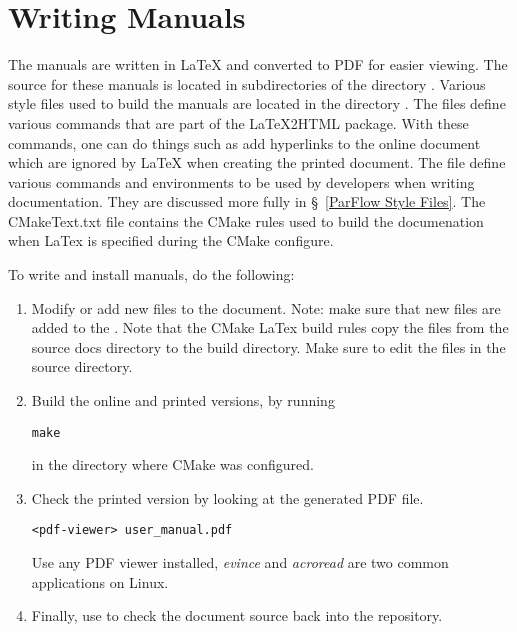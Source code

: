 \section{Writing Manuals}
\label{Writing Manuals}

The \parflow{} manuals are written in LaTeX and converted to PDF for
easier viewing.  The source for these manuals is located in
subdirectories of the directory .  Various
style files used to build the \parflow{} manuals are located in the
directory .  The files 
define various commands that are part of the LaTeX2HTML package.  With
these commands, one can do things such as add hyperlinks to the online
document which are ignored by LaTeX when creating the printed
document.  The file  define various commands and
environments to be used by \parflow{} developers when writing
documentation.  They are discussed more fully in \S~\ref{ParFlow Style
  Files}.  The CMakeText.txt file contains the CMake rules used to
build the documenation when LaTex is specified during the CMake
configure.

To write and install \parflow{} manuals, do the following:
\begin{enumerate}

\item
Modify or add new  files to the document.
Note: make sure that new files are added to the
.
Note that the CMake LaTex build rules copy the files from the source docs directory to 
the build directory.   Make sure to edit the files in the source directory.

\item
Build the online and printed versions, by running
\begin{display}\begin{verbatim}
make
\end{verbatim}\end{display}
in the directory where CMake was configured.

\item
Check the printed version by looking at the generated PDF file.
\begin{display}\begin{verbatim}
<pdf-viewer> user_manual.pdf
\end{verbatim}\end{display}
Use any PDF viewer installed, {\em evince} and {\em acroread} are two common applications on Linux.

\item
Finally, use  to check the document source back
into the repository.

\end{enumerate}

